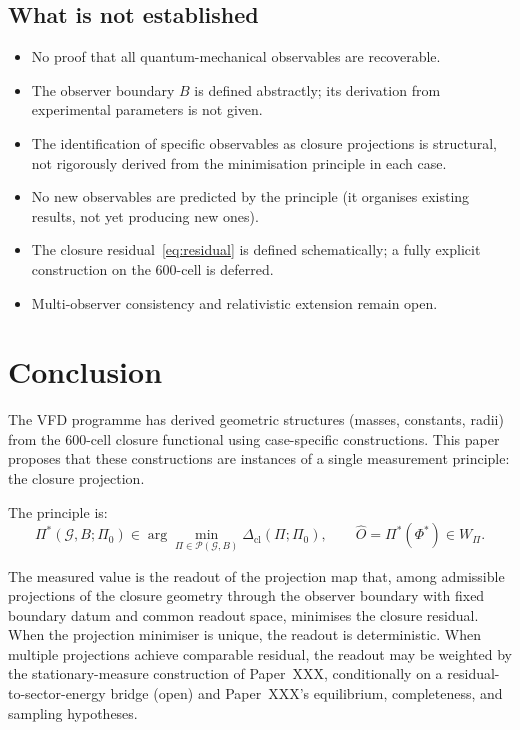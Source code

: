 \documentclass[12pt]{article}
\newcommand{\Pcal}{\mathcal{P}}
\newcommand{\Gcal}{\mathcal{G}}
\newcommand{\Dcl}{\Delta_{\mathrm{cl}}}
\begin{document}
\subsection{What is not established}

\begin{itemize}
    \item No proof that all quantum-mechanical observables are recoverable.
    \item The observer boundary $B$ is defined abstractly; its derivation from experimental parameters is not given.
    \item The identification of specific observables as closure projections is structural, not rigorously derived from the minimisation principle in each case.
    \item No new observables are predicted by the principle (it organises existing results, not yet producing new ones).
    \item The closure residual~\eqref{eq:residual} is defined schematically; a fully explicit construction on the 600-cell is deferred.
    \item Multi-observer consistency and relativistic extension remain open.
\end{itemize}

\section{Conclusion}\label{sec:conclusion}

The VFD programme has derived geometric structures (masses, constants, radii) from the 600-cell closure functional using case-specific constructions. This paper proposes that these constructions are instances of a single measurement principle: the closure projection.

The principle is:
\begin{equation*}
    \Pi^*(\Gcal, B; \Pi_0) \in \arg\min_{\Pi \in \Pcal(\Gcal, B)} \Dcl(\Pi;\Pi_0), \qquad \hat{O} = \Pi^*(\Phi^*) \in W_\Pi.
\end{equation*}

The measured value is the readout of the projection map that, among admissible projections of the closure geometry through the observer boundary with fixed boundary datum and common readout space, minimises the closure residual. When the projection minimiser is unique, the readout is deterministic. When multiple projections achieve comparable residual, the readout may be weighted by the stationary-measure construction of Paper~XXX, conditionally on a residual-to-sector-energy bridge (open) and Paper~XXX's equilibrium, completeness, and sampling hypotheses.
\end{document}
